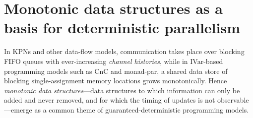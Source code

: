 \section{Monotonic data structures as a basis for deterministic parallelism}\label{s:intro-monotonic}

In KPNs and other data-flow models, communication takes place over
blocking FIFO queues with ever-increasing \emph{channel histories},
while in IVar-based programming models such as CnC and monad-par, a
shared data store of blocking single-assignment memory locations grows
monotonically.  Hence \emph{monotonic data structures}---data
structures to which information can only be added and never removed,
and for which the timing of updates is not observable---emerge as a
common theme of guaranteed-deterministic programming models.

